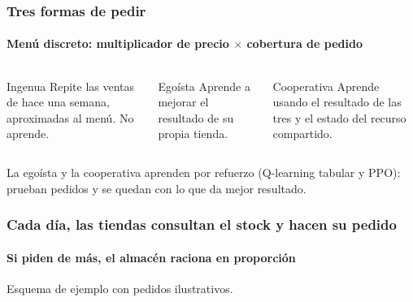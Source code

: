 \documentclass[aspectratio=169,10pt]{beamer}
\begin{document}
\begin{frame}
\frametitle{Tres formas de pedir}
\framesubtitle{Men\'u discreto: multiplicador de precio $\times$ cobertura de pedido}
\begin{columns}[T,onlytextwidth]
\begin{block}{Ingenua}
\scriptsize Repite las ventas de hace una semana, aproximadas al men\'u. No aprende.
\end{block}
\begin{block}{Ego\'ista}
\scriptsize Aprende a mejorar el resultado de su propia tienda.
\end{block}
\begin{block}{Cooperativa}
\scriptsize Aprende usando el resultado de las tres y el estado del recurso compartido.
\end{block}
\end{columns}
\vspace{0.3cm}
\begin{center}
{\scriptsize\color{p2muted} La ego\'ista y la cooperativa aprenden por refuerzo (Q-learning tabular y PPO): prueban pedidos y se quedan con lo que da mejor resultado.\par}
\end{center}
\end{frame}

\begin{frame}
\frametitle{Cada d\'ia, las tiendas consultan el stock y hacen su pedido}
\framesubtitle{Si piden de m\'as, el almac\'en raciona en proporci\'on}
\begin{center}
\end{center}
\vspace{0.2cm}
\begin{center}
{\scriptsize\color{p2muted} Esquema de ejemplo con pedidos ilustrativos.\par}
\end{center}
\end{frame}
\end{document}
